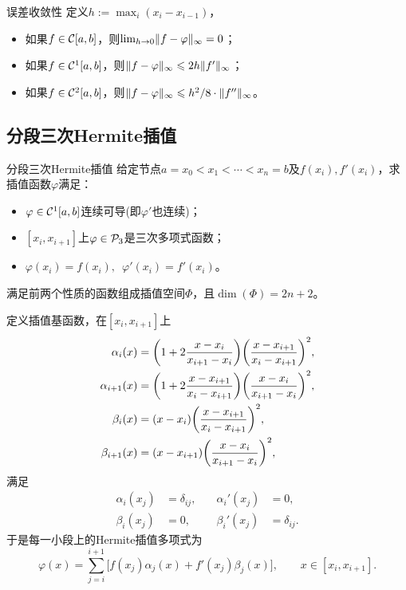 \begin{theorem}
    {误差收敛性}{}
    定义$\textstyle h := \max_i(x_i - x_{i-1})$，
    \begin{itemize}
        \item 如果$f \in \mathcal{C}[a,b]$，则$\textstyle \lim_{h\to0}\lVert f - \varphi\rVert_\infty = 0$；
        \item 如果$f \in \mathcal{C}^1[a,b]$，则$\lVert f - \varphi\rVert_\infty \leqslant 2h\lVert f'\rVert_\infty$；
        \item 如果$f \in \mathcal{C}^2[a,b]$，则$\lVert f - \varphi\rVert_\infty \leqslant h^2/8 \cdot \lVert f''\rVert_\infty$。
    \end{itemize}
\end{theorem}

\subsection{分段三次Hermite插值}

\begin{definition}
    {分段三次Hermite插值}{}
    给定节点$a = x_0 < x_1 < \cdots < x_n = b$及$f(x_i),f'(x_i)$，求插值函数$\varphi$满足：
    \begin{itemize}
        \item $\varphi \in \mathcal{C}^1[a,b]$连续可导(即$\varphi'$也连续)；
        \item $[x_i,x_{i+1}]$上$\varphi \in \mathcal{P}_3$是三次多项式函数；
        \item $\varphi(x_i) = f(x_i),\enspace\varphi'(x_i) = f'(x_i)$。
    \end{itemize}
    满足前两个性质的函数组成插值空间$\Phi$，且$\dim(\Phi) = 2n + 2$。
\end{definition}

定义插值基函数，在$[x_i,x_{i+1}]$上
\begin{subequations}
    \begin{align}
        \alpha_i(x) &= \biggl(1 + 2\frac{x - x_i}{x_{i+1} - x_i}\biggr)\biggl(\frac{x - x_{i+1}}{x_i - x_{i+1}}\biggr)^2,\\
        \alpha_{i+1}(x) &= \biggl(1 + 2\frac{x - x_{i+1}}{x_i - x_{i+1}}\biggr)\biggl(\frac{x - x_i}{x_{i+1} - x_i}\biggr)^2,\\
        \beta_i(x) &= (x - x_i)\biggl(\frac{x - x_{i+1}}{x_i - x_{i+1}}\biggr)^2,\\
        \beta_{i+1}(x) &= (x - x_{i+1})\biggl(\frac{x - x_i}{x_{i+1} - x_i}\biggr)^2,
    \end{align}
\end{subequations}
满足
\begin{subequations}
    \begin{alignat}{2}
        \alpha_i(x_j) &= \delta_{ij},\quad&\alpha_i'(x_j) &= 0,\\
        \beta_i(x_j) &= 0,&\beta_i'(x_j) &= \delta_{ij}.
    \end{alignat}
\end{subequations}
于是每一小段上的Hermite插值多项式为
\begin{equation}
    \varphi(x) = \sum_{j=i}^{i+1}\bigl[f(x_j)\alpha_j(x) + f'(x_j)\beta_j(x)\bigr],
    \qquad x \in [x_i,x_{i+1}].
\end{equation}

